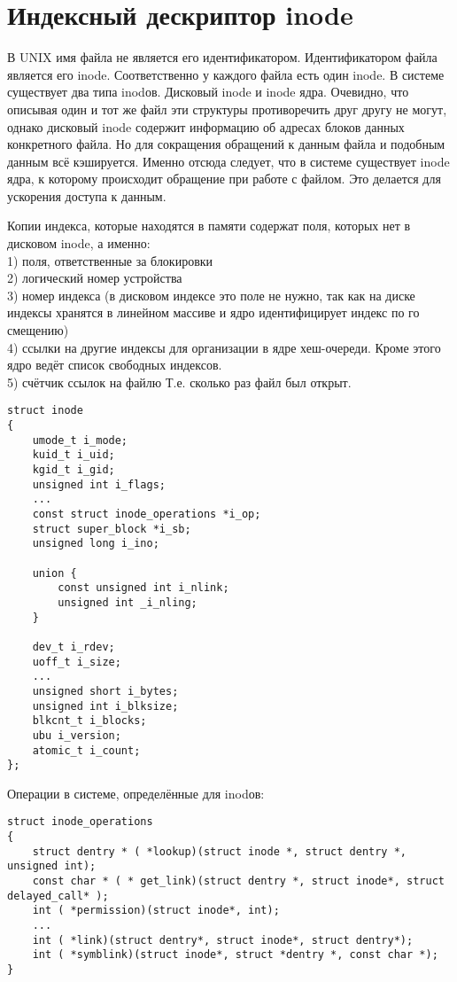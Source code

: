 \section{Индексный дескриптор inode}
В UNIX имя файла не является его идентификатором. Идентификатором файла является его inode. Соответственно у каждого файла есть один inode. В системе существует два типа inodов. Дисковый inode и inode ядра. Очевидно, что описывая один и тот же файл эти структуры противоречить друг другу не могут, однако дисковый inode содержит информацию об адресах блоков данных конкретного файла. Но для сокращения обращений к данным файла и подобным данным всё кэшируется. Именно отсюда следует, что в системе существует inode ядра, к которому происходит обращение при работе с файлом. Это делается для ускорения доступа к данным.

Копии индекса, которые находятся в памяти содержат поля, которых нет в дисковом inode, а именно:\\
1) поля, ответственные за блокировки\\
2) логический номер устройства\\
3) номер индекса (в дисковом индексе это поле не нужно, так как на диске индексы хранятся в линейном массиве и ядро идентифицирует индекс по го смещению)\\
4) ссылки на другие индексы для организации в ядре хеш-очереди. Кроме этого ядро ведёт список свободных индексов.\\
5) счётчик ссылок на файлю Т.е. сколько раз файл был открыт.\\

\begin{lstlisting}
struct inode
{
	umode_t i_mode;
	kuid_t i_uid;
	kgid_t i_gid;
	unsigned int i_flags;
	...
	const struct inode_operations *i_op;
	struct super_block *i_sb;
	unsigned long i_ino;
	
	union {
		const unsigned int i_nlink;
		unsigned int _i_nling;
	}

	dev_t i_rdev;
	uoff_t i_size;
	...
	unsigned short i_bytes;
	unsigned int i_blksize;
	blkcnt_t i_blocks;
	ubu i_version;
	atomic_t i_count;
};
\end{lstlisting}

Операции в системе, определённые для inodов:
\begin{lstlisting}
struct inode_operations
{
	struct dentry * ( *lookup)(struct inode *, struct dentry *, unsigned int);
	const char * ( * get_link)(struct dentry *, struct inode*, struct delayed_call* );
	int ( *permission)(struct inode*, int);
	...
	int ( *link)(struct dentry*, struct inode*, struct dentry*);
	int ( *symblink)(struct inode*, struct *dentry *, const char *); 
}
\end{lstlisting}

